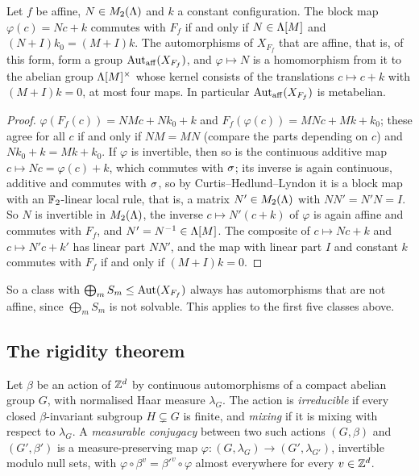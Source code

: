 \begin{lemma}\label{aff:lem:comm}
Let $f$ be affine, $N\in M_2(\Lambda)$ and $k$ a constant configuration. The block map $\varphi(c)=Nc+k$ commutes with $F_f$ if and only if $N\in\Lambda[M]$ and $(N+I)k_0=(M+I)k$. The automorphisms of $X_{F_f}$ that are affine, that is, of this form, form a group $\operatorname{Aut}_{\mathrm{aff}}(X_{F_f})$, and $\varphi\mapsto N$ is a homomorphism from it to the abelian group $\Lambda[M]^{\times}$ whose kernel consists of the translations $c\mapsto c+k$ with $(M+I)k=0$, at most four maps. In particular $\operatorname{Aut}_{\mathrm{aff}}(X_{F_f})$ is metabelian.
\end{lemma}

\begin{proof}
$\varphi(F_f(c))=NMc+Nk_0+k$ and $F_f(\varphi(c))=MNc+Mk+k_0$; these agree for all $c$ if and only if $NM=MN$ (compare the parts depending on $c$) and $Nk_0+k=Mk+k_0$. If $\varphi$ is invertible, then so is the continuous additive map $c\mapsto Nc=\varphi(c)+k$, which commutes with $\sigma$; its inverse is again continuous, additive and commutes with $\sigma$, so by Curtis--Hedlund--Lyndon it is a block map with an $\mathbb{F}_2$-linear local rule, that is, a matrix $N'\in M_2(\Lambda)$ with $NN'=N'N=I$. So $N$ is invertible in $M_2(\Lambda)$, the inverse $c\mapsto N'(c+k)$ of $\varphi$ is again affine and commutes with $F_f$, and $N'=N^{-1}\in\Lambda[M]$. The composite of $c\mapsto Nc+k$ and $c\mapsto N'c+k'$ has linear part $NN'$, and the map with linear part $I$ and constant $k$ commutes with $F_f$ if and only if $(M+I)k=0$.
\end{proof}

So a class with $\bigoplus_mS_m\le\operatorname{Aut}(X_{F_f})$ always has automorphisms that are not affine, since $\bigoplus_mS_m$ is not solvable. This applies to the first five classes above.

\subsection{The rigidity theorem}\label{aff:sec:KS}

Let $\beta$ be an action of $\mathbb{Z}^d$ by continuous automorphisms of a compact abelian group $G$, with normalised Haar measure $\lambda_G$. The action is \emph{irreducible} if every closed $\beta$-invariant subgroup $H\subsetneq G$ is finite, and \emph{mixing} if it is mixing with respect to $\lambda_G$. A \emph{measurable conjugacy} between two such actions $(G,\beta)$ and $(G',\beta')$ is a measure-preserving map $\varphi\colon(G,\lambda_G)\to(G',\lambda_{G'})$, invertible modulo null sets, with $\varphi\circ\beta^{v}=\beta'^{v}\circ\varphi$ almost everywhere for every $v\in\mathbb{Z}^d$.

